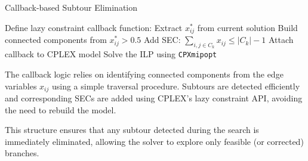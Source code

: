 \begin{algorithm}[H]
\caption{Callback-based Subtour Elimination}
\begin{algorithmic}[1]
\State Define lazy constraint callback function:
\Statex \quad Extract $x^*_{ij}$ from current solution
\Statex \quad Build connected components from $x^*_{ij} > 0.5$
        \State Add SEC: $\sum_{i,j \in C_k} x_{ij} \leq |C_k| - 1$
    \EndFor
\EndIf
\State Attach callback to CPLEX model
\State Solve the ILP using \texttt{CPXmipopt}
\end{algorithmic}
\end{algorithm}

The callback logic relies on identifying connected components from the edge variables $x_{ij}$ using a simple traversal procedure. Subtours are detected efficiently and corresponding SECs are added using CPLEX's lazy constraint API, avoiding the need to rebuild the model.

This structure ensures that any subtour detected during the search is immediately eliminated, allowing the solver to explore only feasible (or corrected) branches.

